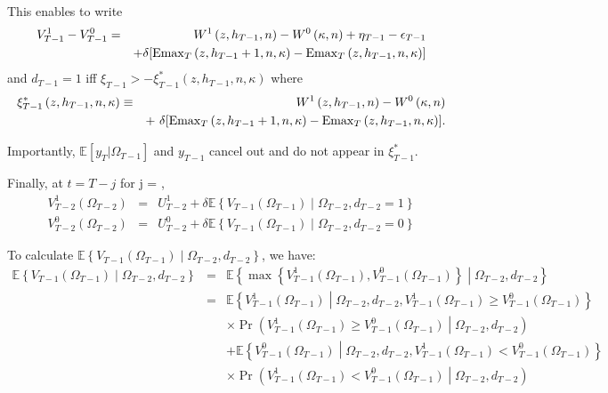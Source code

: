 \noindent This enables to write
\begin{eqnarray}
V^1_{T-1} - V^0_{T-1} &=& W^1\left( z, h_{T-1}, n\right) - W^0\left( \kappa, n\right) + \eta_{T-1} - \epsilon_{T-1} \nonumber \\
& & + \delta [ \operatorname{Emax}_T\left(z, h_{T-1}+1, n, \kappa\right) - \operatorname{Emax}_T\left(z, h_{T-1}, n, \kappa \right)]
\end{eqnarray}
\noindent and $d_{T-1} = 1$ iff $\xi_{T-1} > -\xi^*_{T-1}\left(z, h_{T-1}, n, \kappa\right)$ where
\begin{eqnarray}
\xi^*_{T-1}\left(z, h_{T-1}, n, \kappa \right) &\equiv & W^1\left(z, h_{T-1}, n\right) - W^0\left(\kappa, n\right) \nonumber \\
& &+\ \delta [ \operatorname{Emax}_T\left(z, h_{T-1}+1, n, \kappa\right) - \operatorname{Emax}_T\left(z, h_{T-1}, n, \kappa \right)].
\end{eqnarray}

\indent Importantly, $\mathbb{E} [y_T | \Omega_{T-1}]$ and $y_{T-1}$ cancel out and do not appear in $\xi_{T-1}^*$.

\noindent Finally, at $t = T-j$ for j = ,
\begin{eqnarray*}
V^{1}_{T-2}\left(\Omega_{T-2}\right) &=& U^{1}_{T-2} + 
\delta \mathbb{E} \left\{ V_{T-1}\left(\Omega_{T-1}\right) \middle| \Omega_{T-2}, d_{T-2}=1\right\} \\
V^{0}_{T-2}\left(\Omega_{T-2}\right) &=& U^{0}_{T-2} + 
\delta \mathbb{E} \left\{ V_{T-1}\left(\Omega_{T-1}\right) \middle| \Omega_{T-2}, d_{T-2}=0\right\}
\end{eqnarray*}

\noindent To calculate $\mathbb{E} \left\{ V_{T-1}\left(\Omega_{T-1}\right) \middle| \Omega_{T-2}, d_{T-2}\right\}$, we have:
\begin{eqnarray*}
\mathbb{E} \left\{ V_{T-1}\left(\Omega_{T-1}\right) \middle| \Omega_{T-2}, d_{T-2}\right\} &=& \mathbb{E} \left\{ \max\left\{ V^{1}_{T-1}\left(\Omega_{T-1}\right), V^{0}_{T-1}\left(\Omega_{T-1}\right) \right\} \middle| \Omega_{T-2}, d_{T-2} \right\} \\
&=& \mathbb{E} \left\{ V^{1}_{T-1}\left(\Omega_{T-1}\right) \middle| \Omega_{T-2}, d_{T-2}, V^{1}_{T-1}\left(\Omega_{T-1}\right) \geq V^{0}_{T-1}\left(\Omega_{T-1}\right) \right\} \\
& & \times \Pr\left(V^1_{T-1}\left(\Omega_{T-1}\right) \geq V^0_{T-1}\left(\Omega_{T-1}\right) \middle| \Omega_{T-2}, d_{T-2} \right)\\
& & + \mathbb{E} \left\{ V^{0}_{T-1}\left(\Omega_{T-1}\right) \middle| \Omega_{T-2}, d_{T-2}, V^{1}_{T-1}\left(\Omega_{T-1}\right) < V^{0}_{T-1}\left(\Omega_{T-1}\right) \right\} \\
& & \times \Pr\left(V^1_{T-1}\left(\Omega_{T-1}\right) < V^0_{T-1}\left(\Omega_{T-1}\right) \middle| \Omega_{T-2}, d_{T-2} \right)
\end{eqnarray*}

